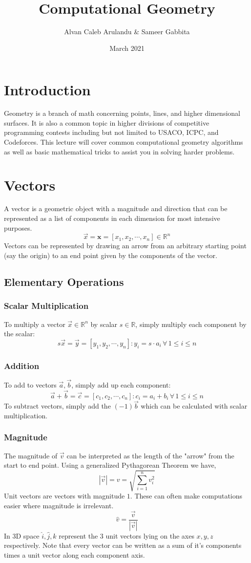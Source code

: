 \documentclass{article}
\title{Computational Geometry}
\author{Alvan Caleb Arulandu \& Sameer Gabbita }
\date{March 2021}
\begin{document}
\maketitle

\section{Introduction}
Geometry is a branch of math concerning points, lines, and higher dimensional surfaces. It is also a common topic in higher divisions of competitive programming contests including but not limited to USACO, ICPC, and Codeforces. This lecture will cover common computational geometry algorithms as well as basic mathematical tricks to assist you in solving harder problems.

\section{Vectors}
A vector is a geometric object with a magnitude and direction that can be represented as a list of components in each dimension for most intensive purposes.
$$\vec{x}=\mathbf{x}=[x_{1},x_{2},\cdots,x_{n}]\in \mathbb{R}^{n}$$
Vectors can be represented by drawing an arrow from an arbitrary starting point (say the origin) to an end point given by the components of the vector. 

\subsection{Elementary Operations}
\subsubsection{Scalar Multiplication}
To multiply a vector $\vec{x}\in\mathbb{R}^{n}$ by scalar $s\in\mathbb{R}$, simply multiply each component by the scalar:
$$s\vec{x}=\vec{y}=[y_{1},y_{2},\cdots,y_{n}]:y_{i}=s\cdot a_{i}\, \forall \, 1\leq i\leq n$$

\subsubsection{Addition}
To add to vectors $\vec{a},\vec{b}$, simply add up each component:
$$\vec{a}+\vec{b}=\vec{c}=[c_{1},c_{2},\cdots,c_{n}] : c_{i}=a_{i}+b_{i}\, \forall\, 1\leq i\leq n$$
To subtract vectors, simply add the $(-1)\vec{b}$ which can be calculated with scalar multiplication.

\subsubsection{Magnitude}
The magnitude of $\vec{v}$ can be interpreted as the length of the "arrow" from the start to end point. Using a generalized Pythagorean Theorem we have,
$$|\vec{v}|=v=\sqrt{\sum_{i=1}^{n}v_{i}^{2}}$$
Unit vectors are vectors with magnitude $1$. These can often make computations easier where magnitude is irrelevant.
$$\hat{v}=\frac{\vec{v}}{|\vec{v}|}$$
In 3D space $\hat{i},\hat{j},\hat{k}$ represent the $3$ unit vectors lying on the axes $x,y,z$ respectively. Note that every vector can be written as a sum of it's components times a unit vector along each component axis.
\end{document}
